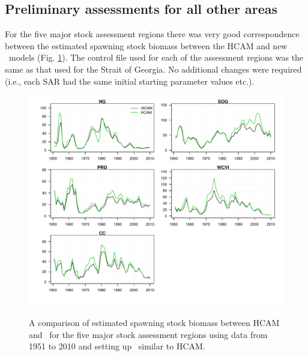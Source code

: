 	
	\subsection{Preliminary assessments for all other areas}
	For the five major stock assessment regions there was very good correspondence between the estimated spawning stock biomass between the HCAM and new \iscam\  models (Fig. \ref{fig:iSCAMvsHCAM}). The control file used for each of the assessment regions was the same as that used for the Strait of Georgia.  No additional changes were required (i.e., each SAR had the same initial starting parameter values etc.).

\begin{figure}[htbp]
	\centering
		\includegraphics[width=\textwidth]{../Figs/iscam_fig_SBt_iSCAMvsHCAM.pdf}\\
	\caption{A comparison of estimated spawning stock biomass between HCAM and \iscam\ for the five major stock assessment regions using data from 1951 to 2010 and setting up \iscam\ similar to HCAM.}
	\label{fig:iSCAMvsHCAM}
\end{figure}

\clearpage
